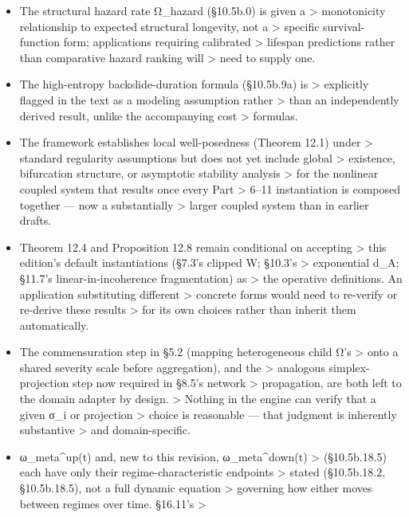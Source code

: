 \documentclass[
]{article}
\begin{document}
\begin{itemize}
\item
  The structural hazard rate Ω\_hazard (§10.5b.0) is given a
  \textgreater{} monotonicity relationship to expected structural
  longevity, not a \textgreater{} specific survival-function form;
  applications requiring calibrated \textgreater{} lifespan predictions
  rather than comparative hazard ranking will \textgreater{} need to
  supply one.
\item
  The high-entropy backslide-duration formula (§10.5b.9a) is
  \textgreater{} explicitly flagged in the text as a modeling assumption
  rather \textgreater{} than an independently derived result, unlike the
  accompanying cost \textgreater{} formulas.
\item
  The framework establishes local well-posedness (Theorem 12.1) under
  \textgreater{} standard regularity assumptions but does not yet
  include global \textgreater{} existence, bifurcation structure, or
  asymptotic stability analysis \textgreater{} for the nonlinear coupled
  system that results once every Part \textgreater{} 6--11 instantiation
  is composed together --- now a substantially \textgreater{} larger
  coupled system than in earlier drafts.
\item
  Theorem 12.4 and Proposition 12.8 remain conditional on accepting
  \textgreater{} this edition's default instantiations (§7.3's clipped
  W; §10.3's \textgreater{} exponential d\_A; §11.7's
  linear-in-incoherence fragmentation) as \textgreater{} the operative
  definitions. An application substituting different \textgreater{}
  concrete forms would need to re-verify or re-derive these results
  \textgreater{} for its own choices rather than inherit them
  automatically.
\item
  The commensuration step in §5.2 (mapping heterogeneous child Ω's
  \textgreater{} onto a shared severity scale before aggregation), and
  the \textgreater{} analogous simplex-projection step now required in
  §8.5's network \textgreater{} propagation, are both left to the domain
  adapter by design. \textgreater{} Nothing in the engine can verify
  that a given σ\_i or projection \textgreater{} choice is reasonable
  --- that judgment is inherently substantive \textgreater{} and
  domain-specific.
\item
  ω\_meta\^{}up(t) and, new to this revision, ω\_meta\^{}down(t)
  \textgreater{} (§10.5b.18.5) each have only their
  regime-characteristic endpoints \textgreater{} stated (§10.5b.18.2,
  §10.5b.18.5), not a full dynamic equation \textgreater{} governing how
  either moves between regimes over time. §16.11's \textgreater{}

\end{itemize}
\end{document}
